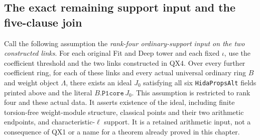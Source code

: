 \subsection{The exact remaining support input and the five-clause join}

Call the following assumption the \emph{rank-four ordinary-support
input on the two constructed links}.  For each original Fit and
Deep tower and each fixed $\iota$, use the coefficient threshold
and the two links constructed in QX4.  Over every further
coefficient ring, for each of these links and every actual
universal ordinary ring $B$ and weight object $\Lambda$, there
exists an ideal $J_0$ satisfying all six \texttt{HidaPropsAlt}
fields printed above and the literal $B.\texttt{P1core}\,J_0$.
This assumption is restricted to rank four and these actual
data.  It asserts existence of the ideal, including finite
torsion-free weight-module structure, classical points and
their two arithmetic endpoints, and characteristic-$\ell$
support.  It is a retained arithmetic input, not a consequence
of QX1 or a name for a theorem already proved in this chapter.

